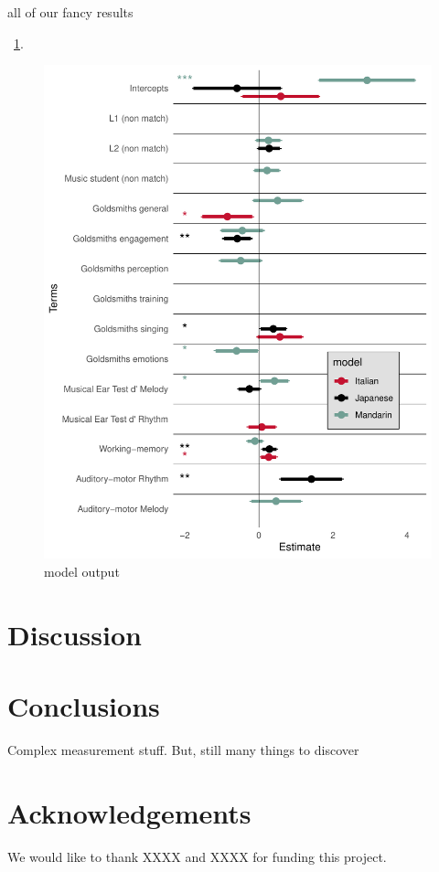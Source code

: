 \documentclass[a4paper]{article}
\begin{document}
all of our fancy results

~\ref{fig:model}.

\begin{figure}[t]
  \centering
  \includegraphics[width=\linewidth]{SP_24_visuals/Japanese,Italian,_Mandarin_max_models_structure:_parsimonious_effects.pdf}
  \caption{model output}
  \label{fig:model}
\end{figure}

\section{Discussion}

\section{Conclusions}

Complex measurement stuff. But, still many things to discover

\section{Acknowledgements}

We would like to thank XXXX and XXXX for funding this project. \\




\end{document}
